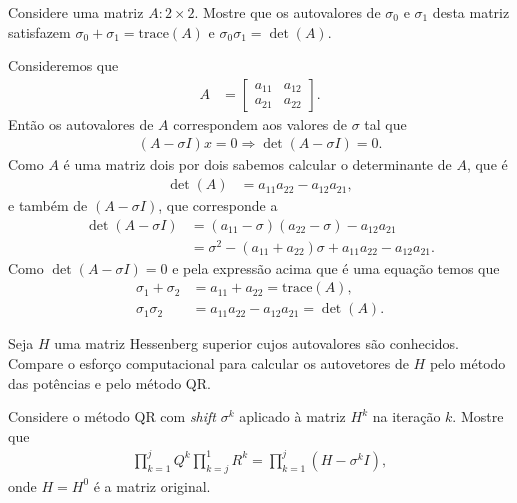 \begin{questions}
    \question Considere uma matriz $A : 2 \times 2$. Mostre que os autovalores de $\sigma_0$ e $\sigma_1$ desta matriz satisfazem $\sigma_0 + \sigma_1 = \mathrm{trace}(A)$ e $\sigma_0 \sigma_1 = \det(A)$.
    \begin{solution}
        Consideremos que
        \begin{align*}
            A &= \begin{bmatrix}
                a_{11} & a_{12} \\
                a_{21} & a_{22}
            \end{bmatrix}.
        \end{align*}
        Ent\~{a}o os autovalores de $A$ correspondem aos valores de $\sigma$ tal que
        \begin{align*}
            (A - \sigma I) x = 0 \Rightarrow \det(A - \sigma I) = 0.
        \end{align*}
        Como $A$ \'{e} uma matriz dois por dois sabemos calcular o determinante de $A$, que \'{e}
        \begin{align*}
            \det(A) &= a_{11} a_{22} - a_{12} a_{21},
        \end{align*}
        e tamb\'{e}m de $(A - \sigma I)$, que corresponde a
        \begin{align*}
            \det(A - \sigma I) &= (a_{11} - \sigma) (a_{22} - \sigma) - a_{12} a_{21} \\
            &= \sigma^2 - (a_{11} + a_{22}) \sigma + a_{11} a_{22} - a_{12} a_{21}.
        \end{align*}
        Como $\det(A - \sigma I) = 0$ e pela express\~{a}o acima que \'{e} uma equa\c{c}\~{a}o temos que
        \begin{align*}
            \sigma_1 + \sigma_2 &= a_{11} + a_{22} = \mathrm{trace}(A), \\
            \sigma_1 \sigma_2 &= a_{11} a_{22} - a_{12} a_{21} = \det(A).
        \end{align*}
    \end{solution}
    
    \question Seja $H$ uma matriz Hessenberg superior cujos autovalores s\~{a}o conhecidos. Compare o esfor\c{c}o computacional para calcular os autovetores de $H$ pelo m\'{e}todo das pot\^{e}ncias e pelo m\'{e}todo QR.
    \begin{solution}
    \end{solution}

    \question Considere o m\'{e}todo QR com \textit{shift} $\sigma^k$ aplicado \`{a} matriz $H^k$ na itera\c{c}\~{a}o $k$. Mostre que
    \begin{align*}
        \prod_{k = 1}^j Q^k \prod_{k = j}^1 R^k = \prod_{k = 1}^j \left( H - \sigma^k I \right),
    \end{align*}
    onde $H = H^0$ \'{e} a matriz original.
    \begin{solution}
    \end{solution}
\end{questions}
